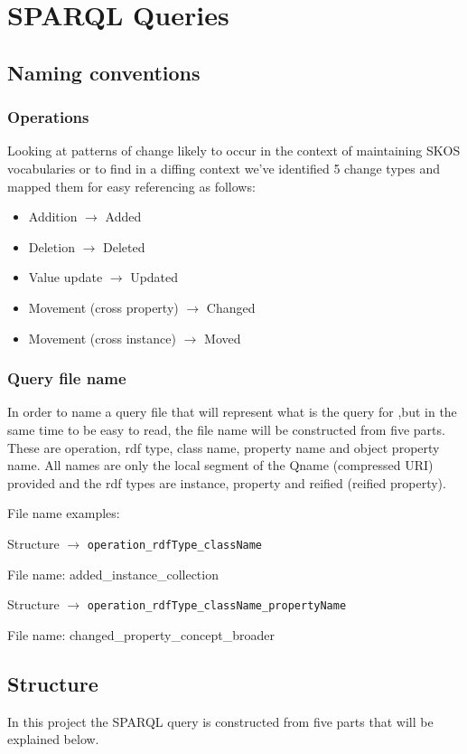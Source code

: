 \section{SPARQL Queries}

\subsection{Naming conventions}
\subsubsection{Operations}

Looking at patterns of change likely to occur in the context of maintaining SKOS vocabularies or to find in a diffing context we've identified 5 change types and mapped them for easy referencing as follows:

\begin{itemize}
  \item Addition $\rightarrow$ Added
  \item Deletion $\rightarrow$ Deleted
  \item Value update $\rightarrow$ Updated
  \item Movement (cross property) $\rightarrow$ Changed
  \item Movement (cross instance) $\rightarrow$ Moved
\end{itemize}

\subsubsection{Query file name}

In order to name a query file that will represent what is the query for ,but in the same time to be easy to read, the file name will be constructed from five parts. These are operation, rdf type, class name, property name and object property name. All names are only the local segment of the Qname (compressed URI) provided and the rdf types are instance, property and reified (reified property).

File name examples:

Structure $\rightarrow$ \texttt{operation\_rdfType\_className}

File name: added\_instance\_collection

Structure $\rightarrow$ \texttt{operation\_rdfType\_className\_propertyName}

File name: changed\_property\_concept\_broader

\subsection{Structure}
In this project the SPARQL query is constructed from five parts that will be explained below.

